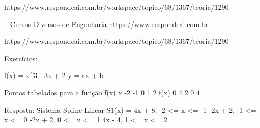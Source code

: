 https://www.respondeai.com.br/workspace/topico/68/1367/teoria/1290

-- Cursos Diversos de Engenharia
https://www.respondeai.com.br

https://www.respondeai.com.br/workspace/topico/68/1367/teoria/1290

Exercícios:

f(x) = x^3 - 3x + 2
y = ax + b

Pontos tabelados para a função f(x)
 x    -2 -1 0 1 2
f(x)   0  4 2 0 4

Resposta: Sistema Spline Linear
S1(x) =  4x + 8, -2 <= x <= -1 
        -2x + 2, -1 <= x <= 0
        -2x + 2,  0 <= x <= 1
         4x - 4,  1 <= x <= 2